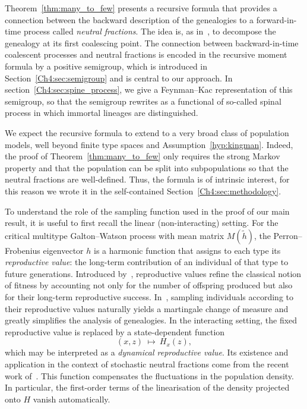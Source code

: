\begin{refsegment}
Theorem~\ref{thm:many_to_few} presents a recursive formula that provides a connection between the backward description of the genealogies to a forward-in-time process called \emph{neutral fractions}. The idea is, as in~\cite{AFRS_2025}, to decompose the genealogy at its first coalescing point.
The connection between backward-in-time coalescent processes and neutral fractions is encoded in the recursive moment formula by a positive semigroup, which is introduced in Section~\ref{Ch4:sec:semigroup} and is central to our approach. In section~\ref{Ch4:sec:spine_process}, we give a Feynman--Kac representation of this semigroup, so that the semigroup rewrites as a functional of so-called spinal process in which immortal lineages are distinguished.


We expect the recursive formula to extend to a very broad class of population models, well beyond finite type spaces and Assumption~\ref{hyp:kingman}.
Indeed, the proof of Theorem~\ref{thm:many_to_few} only requires the strong Markov property and that the population can be split into subpopulations so that the neutral fractions are well-defined.
Thus, the formula is of intrinsic interest, for this reason we wrote it in the self-contained Section~\ref{Ch4:sec:methodology}.

To understand the role of the sampling function used in the proof of our main result, it is useful to first recall the linear (non-interacting) setting. For the critical multitype Galton--Watson process with mean matrix $M(\tilde h)$, the Perron--Frobenius eigenvector $h$ is a harmonic function that assigns to each type its \emph{reproductive value}: the long-term contribution of an individual of that type to future generations. Introduced by~\cite{fisher_genetical_1999}, reproductive values refine the classical notion of fitness by accounting not only for the number of offspring produced but also for their long-term reproductive success. In~\cite{Foutel_Schertzer}, sampling individuals according to their reproductive values naturally yields a martingale change of measure and greatly simplifies the analysis of genealogies.
In the interacting setting, the fixed reproductive value is replaced by a state-dependent function 
\[ 
(x,z)\ \longmapsto\ H_x(z),
\] 
 which may be interpreted as a \emph{dynamical reproductive value}. Its existence and application in the context of stochastic neutral fractions come from the recent work of~\cite{Julie_Zsofia}. This function compensates the fluctuations in the population density. 
 In particular, the first-order terms of the linearisation of the density projected onto $H$ vanish automatically. 


\end{refsegment}
